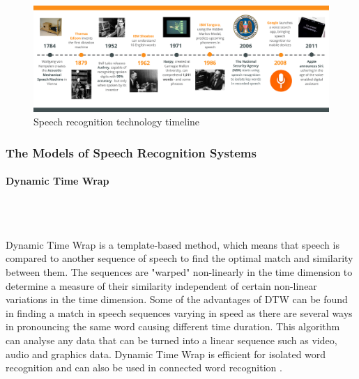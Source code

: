 \documentclass{article}
\newcommand{\subsubsubsection}[1]{\paragraph{#1}\mbox{}\\}
\begin{document}
\begin{figure}[H]
  \centering
  \includegraphics[scale=0.32]{img/speechrecognitiontimeline.png}
  \caption{Speech recognition technology timeline}
  \label{fig:historyofspeechrecognition}
\end{figure}


\subsubsection{The Models of Speech Recognition Systems}

\subsubsubsection{Dynamic Time Wrap}
\\
{\large
Dynamic Time Wrap is a template-based method, which means that speech is compared to another sequence of speech to find the optimal match and similarity between them. The sequences are "warped" non-linearly in the time dimension to determine a measure of their similarity independent of certain non-linear variations in the time dimension. Some of the advantages of DTW can be found in finding a match in speech sequences varying in speed as there are several ways in pronouncing the same word causing different time duration. This algorithm can analyse any data that can be turned into a linear sequence such as video, audio and graphics data. Dynamic Time Wrap is efficient for isolated word recognition and can also be used in connected word recognition \parencite{reviewofspeechrecognitiontechnique}.\par
}

\newpage
\end{document}

